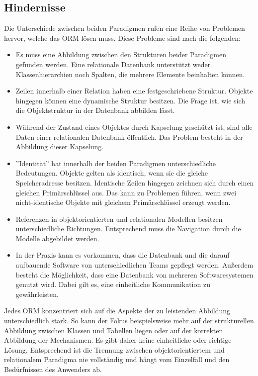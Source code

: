 \subsection{Hindernisse}
Die Unterschiede zwischen beiden Paradigmen rufen eine Reihe von Problemen hervor, welche das ORM lösen muss. Diese Probleme sind nach \cite{ireland_understanding_2009} die folgenden:
\begin{itemize}
    \item Es muss eine Abbildung zwischen den Strukturen beider Paradigmen gefunden werden. Eine relationale Datenbank unterstützt weder Klassenhierarchien noch Spalten, die mehrere Elemente beinhalten können.
    \item Zeilen innerhalb einer Relation haben eine festgeschriebene Struktur. Objekte hingegen können eine dynamische Struktur besitzen. Die Frage ist, wie sich die Objektstruktur in der Datenbank abbilden lässt.
    \item Während der Zustand eines Objektes durch Kapselung geschützt ist, sind alle Daten einer relationalen Datenbank öffentlich. Das Problem besteht in der Abbildung dieser Kapselung.
    \item ''Identität'' hat innerhalb der beiden Paradigmen unterschiedliche Bedeutungen. Objekte gelten als identisch, wenn sie die gleiche Speicheradresse besitzen. Identische Zeilen hingegen zeichnen sich durch einen gleichen Primärschlüssel aus. Das kann zu Problemen führen, wenn zwei nicht-identische Objekte mit gleichem Primärschlüssel erzeugt werden.
    \item Referenzen in objektorientierten und relationalen Modellen besitzen unterschiedliche Richtungen. Entsprechend muss die Navigation durch die Modelle abgebildet werden.
    \item In der Praxis kann es vorkommen, dass die Datenbank und die darauf aufbauende Software von unterschiedlichen Teams gepflegt werden. Außerdem besteht die Möglichkeit, dass eine Datenbank von mehreren Softwaresystemen genutzt wird. Dabei gilt es, eine einheitliche Kommunikation zu gewährleisten.
\end{itemize}
Jedes ORM konzentriert sich auf die Aspekte der zu leistenden Abbildung unterschiedlich stark. So kann der Fokus beispielsweise mehr auf der strukturellen Abbildung zwischen Klassen und Tabellen liegen oder auf der korrekten Abbildung der Mechanismen. Es gibt daher keine einheitliche oder richtige Lösung. Entsprechend ist die Trennung zwischen objektorientiertem und relationalem Paradigma nie vollständig und hängt vom Einzelfall und den Bedürfnissen des Anwenders ab.

